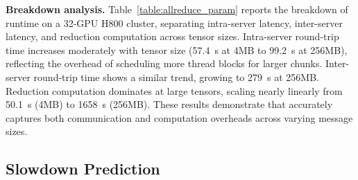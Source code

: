 \begin{table}[t] 
    \centering
    \small
    \renewcommand{\arraystretch}{0.8}
    \caption{The breakdown of \sys's \ar running time, profiled in the H800 cluster using 32 GPUs.}
    \vspace{-4mm}
    \label{table:allreduce_param}
\end{table}

\noindent\textbf{Breakdown analysis.}
Table~\ref{table:allreduce_param} reports the breakdown of \ar runtime on a 32-GPU H800 cluster, separating intra-server latency, inter-server latency, and reduction computation across tensor sizes. 
Intra-server round-trip time increases moderately with tensor size (57.4~\textmu s at 4MB to 99.2~\textmu s at 256MB), reflecting the overhead of scheduling more thread blocks for larger chunks. 
Inter-server round-trip time shows a similar trend, growing to 279~\textmu s at 256MB. 
Reduction computation dominates at large tensors, scaling nearly linearly from 50.1~\textmu s (4MB) to 1658~\textmu s (256MB). 
These results demonstrate that \sys accurately captures both communication and computation overheads across varying message sizes. 




\subsection{Slowdown Prediction} 
\label{subsec:interference_perf}

